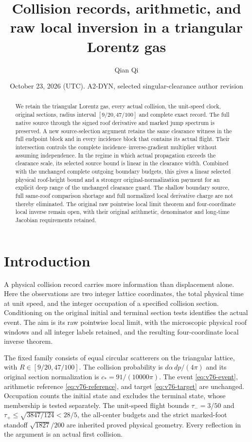 \documentclass[11pt,reqno]{amsart}
\title[Collision records and raw local inversion]{Collision records, arithmetic, and raw local inversion in a triangular Lorentz gas}
\author{Qian Qi}
\date{October 23, 2026 (UTC). A2-DYN, selected singular-clearance author revision}
\numberwithin{equation}{section}
\theoremstyle{definition}\newtheorem{definition}[theorem]{Definition}
\theoremstyle{remark}\newtheorem{remark}[theorem]{Remark}
\begin{document}
\raggedbottom
\begin{abstract}
We retain the triangular Lorentz gas, every actual collision, the unit-speed
clock, original sections, radius interval $[9/20,47/100]$ and complete exact
record. The full native source through the signed roof derivative and marked
jump spectrum is preserved. A new source-selection argument retains the same
clearance witness in the full endpoint block and in every incidence block
that contains its actual flight. Their intersection controls the complete
incidence--inverse-gradient multiplier without assuming independence.
In the regime in which actual propagation exceeds the clearance scale, its
selected source bound is linear in the clearance width. Combined with the
unchanged complete outgoing boundary budgets, this gives a linear selected
physical roof-height bound and a stronger original-normalization payment for
an explicit deep range of the unchanged clearance guard. The shallow boundary
source, full same-roof comparison shortage and full normalized local derivative
charge are not thereby eliminated. The original raw pointwise local limit
theorem and four-coordinate local inverse remain open, with their original
arithmetic, denominator and long-time Jacobian requirements retained.
\end{abstract}
\maketitle
\tableofcontents


\section*{Introduction}
A physical collision record carries more information than displacement
alone. Here the observations are two integer lattice coordinates, the
total physical time at unit speed, and the integer occupation of a
specified collision section. Conditioning on the original initial
and terminal section tests identifies the actual event. The aim is
its raw pointwise local limit, with the microscopic physical roof
windows and all integer labels retained, and the resulting
four-coordinate local inverse theorem.

The fixed family consists of equal circular scatterers on the
triangular lattice, with $R\in[9/20,47/100]$. The collision probability
is $d\alpha\,dp/(4\pi)$ and its original section normalization is
$c_*=91/(10000\pi)$. The event \eqref{eq:v76-event}, arithmetic
reference \eqref{eq:v76-reference}, and target \eqref{eq:v76-target}
are unchanged. Occupation counts the initial state and excludes
the terminal state, whose membership is tested separately.
The unit-speed flight bounds
$\tau_-=3/50$ and $\tau_+\le\sqrt{3847/124}<28/5$, the all-center
budgets and the strict marked-foot standoff $\sqrt{1827}/200$
are inherited proved physical geometry. Every reflection in the
argument is an actual first collision.
\end{document}
